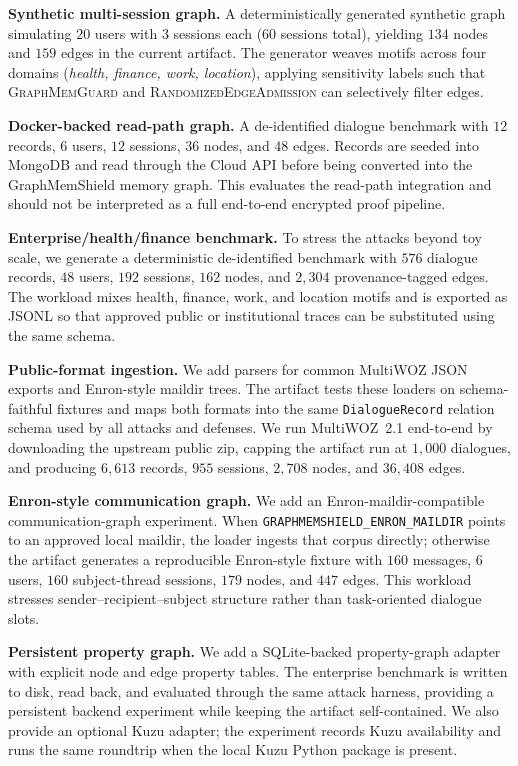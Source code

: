 \documentclass[journal,10pt,twocolumn]{IEEEtran}
\begin{document}
\noindent\textbf{Synthetic multi-session graph.} A deterministically generated
synthetic graph simulating $20$ users with $3$ sessions each
($60$ sessions total), yielding $134$ nodes and $159$ edges in the
current artifact. The generator weaves motifs across four domains
(\emph{health, finance, work, location}), applying sensitivity labels such that 
\textsc{GraphMemGuard} and \textsc{RandomizedEdgeAdmission} can selectively 
filter edges.

\noindent\textbf{Docker-backed read-path graph.} A de-identified
dialogue benchmark with $12$ records, $6$ users, $12$ sessions,
$36$ nodes, and $48$ edges. Records are seeded into MongoDB and read
through the Cloud API before being converted into the GraphMemShield
memory graph. This evaluates the read-path integration and should not
be interpreted as a full end-to-end encrypted proof pipeline.

\noindent\textbf{Enterprise/health/finance benchmark.} To stress the
attacks beyond toy scale, we generate a deterministic de-identified
benchmark with $576$ dialogue records, $48$ users, $192$ sessions,
$162$ nodes, and $2,304$ provenance-tagged edges. The workload mixes
health, finance, work, and location motifs and is exported as JSONL so
that approved public or institutional traces can be substituted using
the same schema.

\noindent\textbf{Public-format ingestion.} We add parsers for common
MultiWOZ JSON exports and Enron-style maildir trees. The artifact
tests these loaders on schema-faithful fixtures and maps both formats
into the same \texttt{DialogueRecord} relation schema used by all
attacks and defenses. We run MultiWOZ~2.1 end-to-end by downloading
the upstream public zip, capping the artifact run at $1,000$
dialogues, and producing $6,613$ records, $955$ sessions, $2,708$
nodes, and $36,408$ edges.

\noindent\textbf{Enron-style communication graph.} We add an
Enron-maildir-compatible communication-graph experiment. When
\texttt{GRAPHMEMSHIELD\_ENRON\_MAILDIR} points to an approved local
maildir, the loader ingests that corpus directly; otherwise the
artifact generates a reproducible Enron-style fixture with $160$
messages, $6$ users, $160$ subject-thread sessions, $179$ nodes, and
$447$ edges. This workload stresses sender--recipient--subject
structure rather than task-oriented dialogue slots.

\noindent\textbf{Persistent property graph.} We add a SQLite-backed
property-graph adapter with explicit node and edge property tables.
The enterprise benchmark is written to disk, read back, and evaluated
through the same attack harness, providing a persistent backend
experiment while keeping the artifact self-contained. We also provide
an optional Kuzu adapter; the experiment records Kuzu availability and
runs the same roundtrip when the local Kuzu Python package is present.
\end{document}
